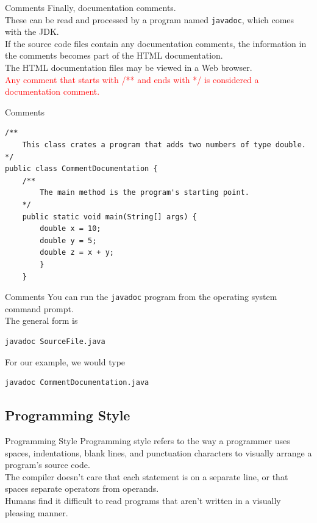 \documentclass[11pt]{beamer}
\newcommand{\red}[1]{\textcolor{red}{#1}}
\begin{document}
\begin{frame}[fragile]{Comments}
    Finally, documentation comments. \\ \vspace{1em}
    These can be read and processed by a program named \texttt{javadoc}, which comes with the JDK. \\ \vspace{1em}
    If the source code files contain any documentation comments, the information in the comments becomes part of the HTML documentation. \\ \vspace{1em}
    The HTML documentation files may be viewed in a Web browser. \\ \vspace{1em}
    \red{Any comment that starts with \slash{}** and ends with *\slash{} is considered a documentation comment.}
\end{frame}

\begin{frame}[fragile]{Comments}
    \begin{lstlisting}
/**
    This class crates a program that adds two numbers of type double.
*/
public class CommentDocumentation {
    /**
        The main method is the program's starting point.
    */
    public static void main(String[] args) {
        double x = 10;
        double y = 5;
        double z = x + y;
        }
    }
    \end{lstlisting}
\end{frame}

\begin{frame}[fragile]{Comments}
    You can run the \texttt{javadoc} program from the operating system command prompt. \\ \vspace{1em}
    The general form is
\begin{lstlisting}
javadoc SourceFile.java
\end{lstlisting}
    For our example, we would type
\begin{lstlisting}
javadoc CommentDocumentation.java
\end{lstlisting}
\end{frame}

\subsection{Programming Style}
\begin{frame}[fragile]{Programming Style}
    Programming style refers to the way a programmer uses spaces, indentations, blank lines, and punctuation characters to visually arrange a program's source code. \\ \vspace{1em}
    The compiler doesn't care that each statement is on a separate line, or that spaces separate operators from operands. \\ \vspace{1em}
    Humans find it difficult to read programs that aren't written in a visually pleasing manner.
\end{frame}
\end{document}
